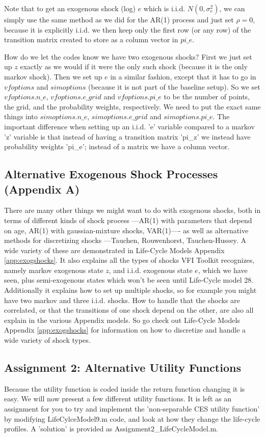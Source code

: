 Note that to get an exogenous shock (log) $e$ which is i.i.d. $N(0,\sigma_{e}^2)$, we can simply use the same method as we did for the AR(1) process and just set $\rho=0$, because it is explicitly i.i.d. we then keep only the first row (or any row) of the transition matrix created to store as a column vector in $pi\_{}e$.

How do we let the codes know we have two exogenous shocks? First we just set up $z$ exactly as we would if it were the only such shock (because it is the only markov shock). Then we set up $e$ in a similar fashion, except that it has to go in $vfoptions$ and $simoptions$ (because it is not part of the baseline setup). So we set $vfoptions.n\_{}e$, $vfoptions.e\_{}grid$ and $vfoptions.pi\_{}e$ to be the number of points, the grid, and the probability weights, respectively. We need to put the exact same things into $simoptions.n\_{}e$, $simoptions.e\_{}grid$ and $simoptions.pi\_{}e$. The important difference when setting up an i.i.d. 'e' variable compared to a markov 'z' variable is that instead of having a transition matrix 'pi\_{}z' we instead have probability weights 'pi\_{}e'; instead of a matrix we have a column vector.

\subsection{Alternative Exogenous Shock Processes (Appendix A)}
There are many other things we might want to do with exogenous shocks, both in terms of different kinds of shock process ---AR(1) with parameters that depend on age, AR(1) with gaussian-mixture shocks, VAR(1)---- as well as alternative methods for discretizing shocks ---Tauchen, Rouwenhorst, Tauchen-Hussey. A wide variety of these are demonstrated in Life-Cycle Models Appendix \ref{app:exogshocks}. It also explains all the types of shocks VFI Toolkit recognizes, namely markov exogenous state $z$, and i.i.d. exogenous state $e$, which we have seen, plus semi-exogenous states which won't be seen until Life-Cycle model 28. Additionally it explains how to set up multiple shocks, so for example you might have two markov and three i.i.d. shocks. How to handle that the shocks are correlated, or that the transitions of one shock depend on the other, are also all explain in the various Appendix models. So go check out Life-Cycle Models Appendix \ref{app:exogshocks} for information on how to discretize and handle a wide variety of shock types.

\subsection{Assignment 2: Alternative Utility Functions}
Because the utility function is coded inside the return function changing it is easy. We will now present a few different utility functions. It is left as an assignment for you to try and implement the 'non-separable CES utility function' by modifying LifeCylceModel9.m code, and look at how they change the life-cycle profiles. A 'solution' is provided as Assignment2\_{}LifeCycleModel.m.

